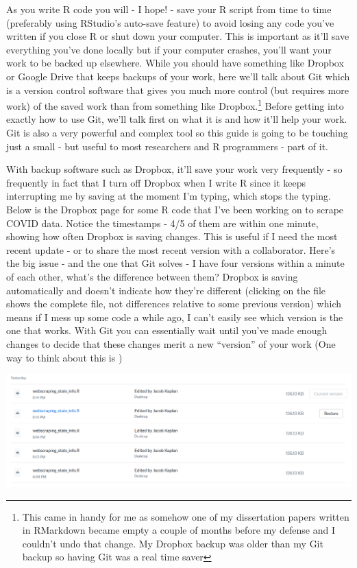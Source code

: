 \documentclass[
]{krantz}
\begin{document}
As you write R code you will - I hope! - save your R script from time to time (preferably using RStudio's auto-save feature) to avoid losing any code you've written if you close R or shut down your computer. This is important as it'll save everything you've done locally but if your computer crashes, you'll want your work to be backed up elsewhere. While you should have something like Dropbox or Google Drive that keeps backups of your work, here we'll talk about Git which is a version control software that gives you much more control (but requires more work) of the saved work than from something like Dropbox.\footnote{This came in handy for me as somehow one of my dissertation papers written in RMarkdown became empty a couple of months before my defense and I couldn't undo that change. My Dropbox backup was older than my Git backup so having Git was a real time saver} Before getting into exactly how to use Git, we'll talk first on what it is and how it'll help your work. Git is also a very powerful and complex tool so this guide is going to be touching just a small - but useful to most researchers and R programmers - part of it.

With backup software such as Dropbox, it'll save your work very frequently - so frequently in fact that I turn off Dropbox when I write R since it keeps interrupting me by saving at the moment I'm typing, which stops the typing. Below is the Dropbox page for some R code that I've been working on to scrape COVID data. Notice the timestamps - 4/5 of them are within one minute, showing how often Dropbox is saving changes. This is useful if I need the most recent update - or to share the most recent version with a collaborator. Here's the big issue - and the one that Git solves - I have four versions within a minute of each other, what's the difference between them? Dropbox is saving automatically and doesn't indicate how they're different (clicking on the file shows the complete file, not differences relative to some previous version) which means if I mess up some code a while ago, I can't easily see which version is the one that works. With Git you can essentially wait until you've made enough changes to decide that these changes merit a new ``version'' of your work (One way to think about this is )

\includegraphics{images/dropbox.png}
\end{document}
